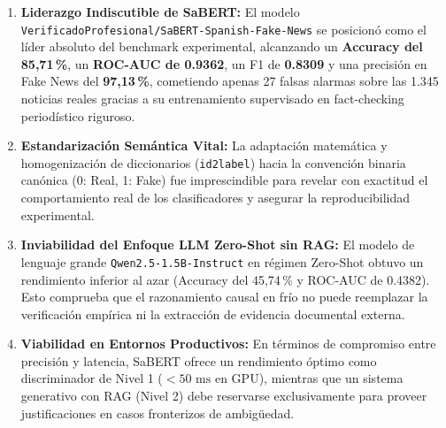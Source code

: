 \begin{enumerate}
    \item \textbf{Liderazgo Indiscutible de SaBERT:} El modelo \texttt{VerificadoProfesional/SaBERT-Spanish-Fake-News} se posicionó como el líder absoluto del benchmark experimental, alcanzando un \textbf{Accuracy del 85,71\,\%}, un \textbf{ROC-AUC de 0.9362}, un F1 de \textbf{0.8309} y una precisión en Fake News del \textbf{97,13\,\%}, cometiendo apenas 27 falsas alarmas sobre las 1.345 noticias reales gracias a su entrenamiento supervisado en fact-checking periodístico riguroso.
    \item \textbf{Estandarización Semántica Vital:} La adaptación matemática y homogenización de diccionarios (\texttt{id2label}) hacia la convención binaria canónica (0: Real, 1: Fake) fue imprescindible para revelar con exactitud el comportamiento real de los clasificadores y asegurar la reproducibilidad experimental.
    \item \textbf{Inviabilidad del Enfoque LLM Zero-Shot sin RAG:} El modelo de lenguaje grande \texttt{Qwen2.5-1.5B-Instruct} en régimen Zero-Shot obtuvo un rendimiento inferior al azar (Accuracy del 45,74\,\% y ROC-AUC de 0.4382). Esto comprueba que el razonamiento causal en frío no puede reemplazar la verificación empírica ni la extracción de evidencia documental externa.
    \item \textbf{Viabilidad en Entornos Productivos:} En términos de compromiso entre precisión y latencia, SaBERT ofrece un rendimiento óptimo como discriminador de Nivel 1 ($< 50\text{ ms}$ en GPU), mientras que un sistema generativo con RAG (Nivel 2) debe reservarse exclusivamente para proveer justificaciones en casos fronterizos de ambigüedad.
\end{enumerate}